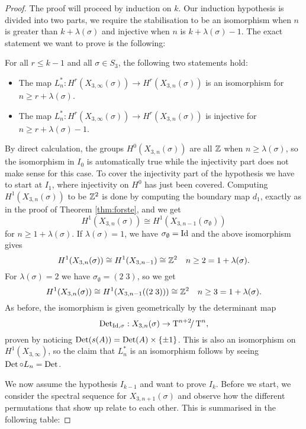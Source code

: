 \begin{proof}
  The proof will proceed by induction on $k$. Our induction hypothesis
  is divided into two parts, we require the stabilisation to be an
  isomorphism when $n$ is greater than $k+\lambda(\sigma)$ and
  injective when $n$ is $k+\lambda(\sigma)-1$. The exact statement we
  want to prove is the following:
  \begin{hypothesis}[$I_{k-1}$]
    For all $r \leq k-1$ and all $\sigma \in S_3$, the following two
    statements hold:
    \begin{itemize}
    \item The map $L_{n}^* : H^r(X_{3,\infty}(\sigma)) \to
      H^r(X_{3,n}(\sigma))$ is an isomorphism for $n \geq r +
      \lambda(\sigma)$.
    \item The map $L_{n}^* : H^r(X_{3,\infty}(\sigma)) \to
      H^r(X_{3,n}(\sigma))$ is injective for $n \geq r +\lambda(\sigma)
      -1$.
    \end{itemize}
  \end{hypothesis}
  
  By direct calculation, the
  groups $H^0(X_{3,n}(\sigma))$ are all $\mathbb{Z}$ when $n \geq
  \lambda(\sigma)$, so the isomorphism in $I_0$ is automatically
  true while the injectivity part does not make sense for this
  case. To cover the injectivity part of the hypothesis we have
  to start at $I_1$, where injectivity on $H^0$ has just been
  covered. Computing $H^1(X_{3,n}(\sigma))$ to be $\mathbb{Z}^2$ is done
  by computing the boundary map $d_1$, exactly as in the proof of
  Theorem \ref{thm:forste}, and we get
  \[ H^1(X_{3,n}(\sigma)) \cong H^1(X_{3,n-1}(\sigma_\emptyset)) \]
  for $n \geq 1 + \lambda(\sigma)$. If $\lambda(\sigma) = 1$, we have
  $\sigma_\emptyset = \operatorname{Id}$ and the above isomorphism gives
  \[ H^1(X_{3,n}(\sigma)) \cong H^1(X_{3,n-1})\cong \mathbb{Z}^2 \quad n \geq
  2 = 1 + \lambda(\sigma). \]
  For $\lambda(\sigma) = 2$ we have $\sigma_\emptyset = (2\; 3)$, so
  we get
  \[ H^1(X_{3,n}(\sigma)) \cong H^1(X_{3,n-1}((2\; 3))) \cong \mathbb{Z}^2
  \quad n \geq 3 = 1 + \lambda(\sigma). \]
  As before, the isomorphism is given geometrically by the
  determinant map
  \[ \operatorname{Det}_{\operatorname{Id},\sigma} : X_{3,n}(\sigma) \to \operatorname{T}^{n+2}\!\!/\operatorname{T}^n, \]
  proven by noticing $\operatorname{Det}(s(A)) = \operatorname{Det}(A)\times \left\{ \pm 1 \right\}$. This is
  also an isomorphism on $H^1(X_{3,\infty})$, so the claim that
  $L_n^*$ is an isomorphism follows by seeing $\operatorname{Det} \circ L_n = \operatorname{Det}$.
  
  We now assume the hypothesis $I_{k-1}$ and want to prove $I_k$. Before
  we start, we consider the spectral sequence for $X_{3,n+1}(\sigma)$
  and observe how the different permutations that show up relate to each
  other. This is summarised in the following table:
  

\end{proof}
